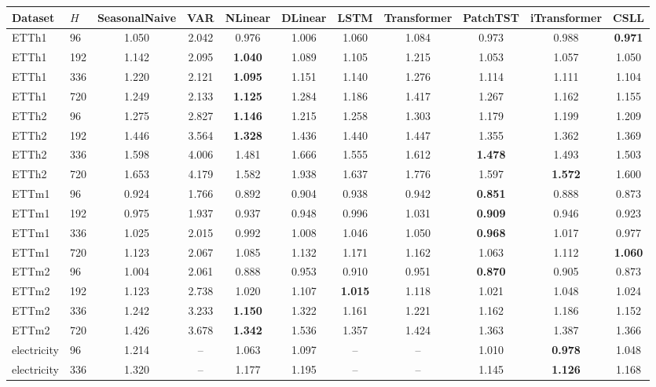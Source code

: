 \begin{tabular}{llccccccccc}
\toprule
Dataset & $H$ & SeasonalNaive & VAR & NLinear & DLinear & LSTM & Transformer & PatchTST & iTransformer & CSLL \\
\midrule
ETTh1 & 96 & 1.050 & 2.042 & 0.976 & 1.006 & 1.060 & 1.084 & 0.973 & 0.988 & \textbf{0.971} \\
ETTh1 & 192 & 1.142 & 2.095 & \textbf{1.040} & 1.089 & 1.105 & 1.215 & 1.053 & 1.057 & 1.050 \\
ETTh1 & 336 & 1.220 & 2.121 & \textbf{1.095} & 1.151 & 1.140 & 1.276 & 1.114 & 1.111 & 1.104 \\
ETTh1 & 720 & 1.249 & 2.133 & \textbf{1.125} & 1.284 & 1.186 & 1.417 & 1.267 & 1.162 & 1.155 \\
ETTh2 & 96 & 1.275 & 2.827 & \textbf{1.146} & 1.215 & 1.258 & 1.303 & 1.179 & 1.199 & 1.209 \\
ETTh2 & 192 & 1.446 & 3.564 & \textbf{1.328} & 1.436 & 1.440 & 1.447 & 1.355 & 1.362 & 1.369 \\
ETTh2 & 336 & 1.598 & 4.006 & 1.481 & 1.666 & 1.555 & 1.612 & \textbf{1.478} & 1.493 & 1.503 \\
ETTh2 & 720 & 1.653 & 4.179 & 1.582 & 1.938 & 1.637 & 1.776 & 1.597 & \textbf{1.572} & 1.600 \\
ETTm1 & 96 & 0.924 & 1.766 & 0.892 & 0.904 & 0.938 & 0.942 & \textbf{0.851} & 0.888 & 0.873 \\
ETTm1 & 192 & 0.975 & 1.937 & 0.937 & 0.948 & 0.996 & 1.031 & \textbf{0.909} & 0.946 & 0.923 \\
ETTm1 & 336 & 1.025 & 2.015 & 0.992 & 1.008 & 1.046 & 1.050 & \textbf{0.968} & 1.017 & 0.977 \\
ETTm1 & 720 & 1.123 & 2.067 & 1.085 & 1.132 & 1.171 & 1.162 & 1.063 & 1.112 & \textbf{1.060} \\
ETTm2 & 96 & 1.004 & 2.061 & 0.888 & 0.953 & 0.910 & 0.951 & \textbf{0.870} & 0.905 & 0.873 \\
ETTm2 & 192 & 1.123 & 2.738 & 1.020 & 1.107 & \textbf{1.015} & 1.118 & 1.021 & 1.048 & 1.024 \\
ETTm2 & 336 & 1.242 & 3.233 & \textbf{1.150} & 1.322 & 1.161 & 1.221 & 1.162 & 1.186 & 1.152 \\
ETTm2 & 720 & 1.426 & 3.678 & \textbf{1.342} & 1.536 & 1.357 & 1.424 & 1.363 & 1.387 & 1.366 \\
electricity & 96 & 1.214 & -- & 1.063 & 1.097 & -- & -- & 1.010 & \textbf{0.978} & 1.048 \\
electricity & 336 & 1.320 & -- & 1.177 & 1.195 & -- & -- & 1.145 & \textbf{1.126} & 1.168 \\

\end{tabular}
